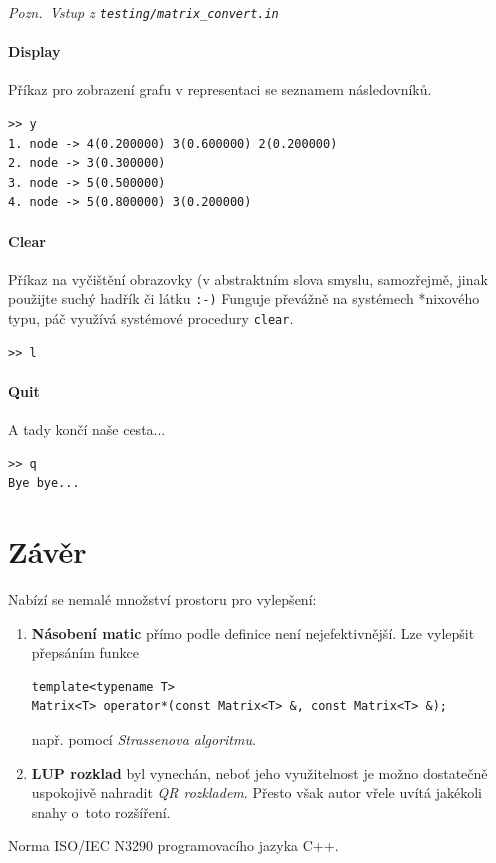 \documentclass[11pt,a4paper]{article}
\newcommand{\cpp}{\textsc{C++}}
\begin{document}
{\noindent \sl Pozn.~Vstup z \tt testing/matrix\_convert.in}

\subsection{Display}
Příkaz pro zobrazení grafu v representaci se seznamem následovníků.



\begin{verbatim}
>> y
1. node -> 4(0.200000) 3(0.600000) 2(0.200000)
2. node -> 3(0.300000)
3. node -> 5(0.500000)
4. node -> 5(0.800000) 3(0.200000)
\end{verbatim}

\subsection{Clear}
Příkaz na vyčištění obrazovky (v abstraktním slova smyslu, samozřejmě, jinak
použijte suchý hadřík či látku {\tt :-)}
Funguje převážně na systémech *nixového typu, páč využívá systémové procedury
\verb=clear=.

\begin{verbatim}
>> l
\end{verbatim}

\subsection{Quit}
A tady končí naše cesta...

\begin{verbatim}
>> q
Bye bye...
\end{verbatim}

\pagebreak

\part{Závěr}

Nabízí se nemalé množství prostoru pro vylepšení:
\begin{enumerate}
  \item {\bf Násobení matic\/} přímo podle definice není nejefektivnější.
    Lze vylepšit přepsáním funkce
\begin{verbatim}template<typename T>
Matrix<T> operator*(const Matrix<T> &, const Matrix<T> &);\end{verbatim}
    např. pomocí \emph{Strassenova algoritmu\/}.
  \item {\bf LUP rozklad\/} byl vynechán, neboť jeho využitelnost je možno
    do\-sta\-teč\-ně uspokojivě nahradit \emph{QR rozkladem\/}.
    Přesto však autor vřele uvítá jakékoli snahy o~toto rozšíření.
\end{enumerate}

\pagebreak

\begin{thebibliography}{9}

Norma \textsc{ISO/IEC N3290} programovacího jazyka \cpp.

\end{thebibliography}
\end{document}
